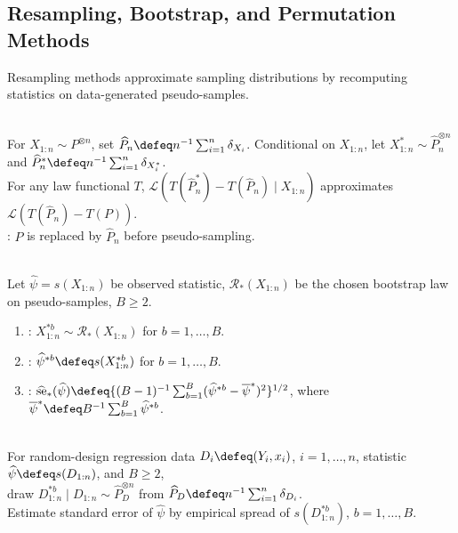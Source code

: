 \subsection{Resampling, Bootstrap, and Permutation Methods}

Resampling methods approximate sampling distributions by recomputing statistics on data-generated pseudo-samples.

\begin{definition} \label{def:nonparametric-bootstrap} \\
For $X_{1:n}\sim P^{\otimes n}$, set $\widehat{P}_n\defeq n^{-1}\sum_{i=1}^{n}\delta_{X_i}$. Conditional on $X_{1:n}$, let $X_{1:n}^\ast\sim\widehat{P}_n^{\otimes n}$ and $\widehat{P}_n^\ast\defeq n^{-1}\sum_{i=1}^{n}\delta_{X_i^\ast}$.\\
For any law functional $T$, $\mathcal{L}(T(\widehat{P}_n^\ast)-T(\widehat{P}_n)\mid X_{1:n})$ approximates $\mathcal{L}(T(\widehat{P}_n)-T(P))$.\\
: $P$ is replaced by $\widehat{P}_n$ before pseudo-sampling.
\end{definition}

\begin{method} \label{meth:bootstrap-standard-error} \\
Let $\widehat{\psi}=s(X_{1:n})$ be observed statistic, $\mathcal{R}_\ast(X_{1:n})$ be the chosen bootstrap law on pseudo-samples, $B\geq2$.
\begin{enumerate}[label=(\roman*)]
\setlength{\itemsep}{0pt}
\item {}: $X_{1:n}^{\ast b}\sim\mathcal{R}_\ast(X_{1:n})$ for $b=1,\ldots,B$.
\item {}: $\widehat{\psi}^{\ast b}\defeq s(X_{1:n}^{\ast b})$ for $b=1,\ldots,B$.
\item {}: $\widehat{\operatorname{se}}_\ast(\widehat{\psi})\defeq\{(B-1)^{-1}\sum_{b=1}^{B}(\widehat{\psi}^{\ast b}-\overline{\psi}^{\ast})^2\}^{1/2}$, where $\overline{\psi}^{\ast}\defeq B^{-1}\sum_{b=1}^{B}\widehat{\psi}^{\ast b}$.
\end{enumerate}
\end{method}

\begin{method} \label{meth:pairs-bootstrap-for-regression-statistics} \\
For random-design regression data $D_i\defeq(Y_i,x_i)$, $i=1,\ldots,n$, statistic $\widehat{\psi}\defeq s(D_{1:n})$, and $B\geq2$,\\
draw $D_{1:n}^{\ast b}\mid D_{1:n}\sim\widehat{P}_D^{\otimes n}$ from $\widehat{P}_D\defeq n^{-1}\sum_{i=1}^{n}\delta_{D_i}$.\\
Estimate standard error of $\widehat{\psi}$ by empirical spread of $s(D_{1:n}^{\ast b})$, $b=1,\ldots,B$.
\end{method}

